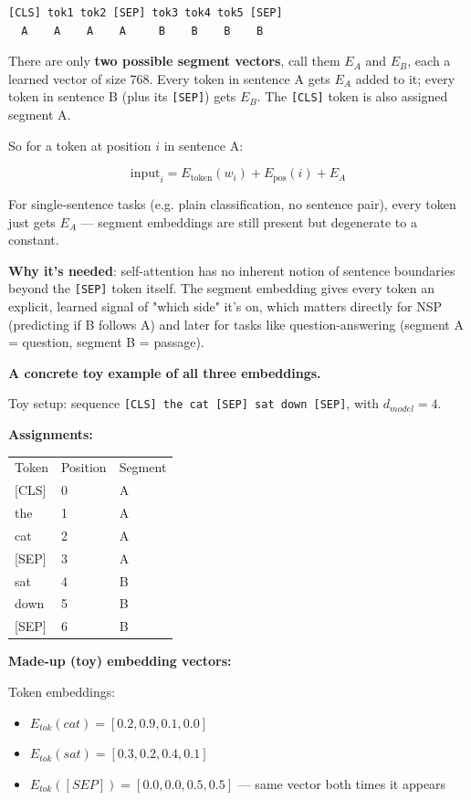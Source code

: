 \begin{verbatim}
[CLS] tok1 tok2 [SEP] tok3 tok4 tok5 [SEP]
  A    A    A    A     B    B    B    B
\end{verbatim}

There are only \textbf{two possible segment vectors}, call them $E_A$ and $E_B$, each a learned vector of size 768. Every token in sentence A gets $E_A$ added to it; every token in sentence B (plus its \texttt{[SEP]}) gets $E_B$. The \texttt{[CLS]} token is also assigned segment A.

So for a token at position $i$ in sentence A:

\[
\text{input}_i = E_{\text{token}}(w_i) + E_{\text{pos}}(i) + E_A
\]

For single-sentence tasks (e.g. plain classification, no sentence pair), every token just gets $E_A$ --- segment embeddings are still present but degenerate to a constant.

\textbf{Why it's needed}: self-attention has no inherent notion of sentence boundaries beyond the \texttt{[SEP]} token itself. The segment embedding gives every token an explicit, learned signal of "which side" it's on, which matters directly for NSP (predicting if B follows A) and later for tasks like question-answering (segment A = question, segment B = passage).

\textbf{A concrete toy example of all three embeddings.}

Toy setup: sequence \texttt{[CLS] the cat [SEP] sat down [SEP]}, with $d_{model}=4$.

\textbf{Assignments:}

\begin{tabular}{lll}
Token & Position & Segment \\
{[CLS]} & 0 & A \\
the & 1 & A \\
cat & 2 & A \\
{[SEP]} & 3 & A \\
sat & 4 & B \\
down & 5 & B \\
{[SEP]} & 6 & B \\
\end{tabular}

\textbf{Made-up (toy) embedding vectors:}

Token embeddings:
\begin{itemize}
\item $E_{tok}(cat) = [0.2, 0.9, 0.1, 0.0]$
\item $E_{tok}(sat) = [0.3, 0.2, 0.4, 0.1]$
\item $E_{tok}([SEP]) = [0.0, 0.0, 0.5, 0.5]$ --- same vector both times it appears
\end{itemize}

